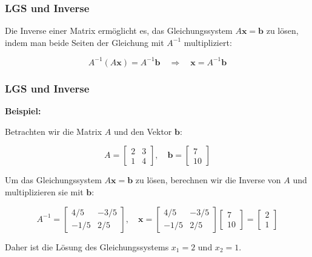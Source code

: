 \documentclass{beamer}
\begin{document}
\begin{frame}
  \frametitle{LGS und Inverse}
  Die Inverse einer Matrix ermöglicht es, das Gleichungssystem $A \mathbf{x} = \mathbf{b}$ zu lösen, indem man beide Seiten der Gleichung mit $A^{-1}$ multipliziert:
  
  \[
  A^{-1} (A \mathbf{x}) = A^{-1} \mathbf{b} \quad \Rightarrow \quad \mathbf{x} = A^{-1} \mathbf{b}
  \]
\end{frame}

\begin{frame}
  \frametitle{LGS und Inverse}
  \textbf{Beispiel:}
  
  Betrachten wir die Matrix $A$ und den Vektor $\mathbf{b}$:
  
  \[
  A = \begin{bmatrix} 2 & 3 \\ 1 & 4 \end{bmatrix}, \quad \mathbf{b} = \begin{bmatrix} 7 \\ 10 \end{bmatrix}
  \]
  
  Um das Gleichungssystem $A \mathbf{x} = \mathbf{b}$ zu lösen, berechnen wir die Inverse von $A$ und multiplizieren sie mit $\mathbf{b}$:
  
  \[
  A^{-1} = \begin{bmatrix} 4/5 & -3/5 \\ -1/5 & 2/5 \end{bmatrix}, \quad \mathbf{x} = \begin{bmatrix} 4/5 & -3/5 \\ -1/5 & 2/5 \end{bmatrix} \begin{bmatrix} 7 \\ 10 \end{bmatrix} = \begin{bmatrix} 2 \\ 1 \end{bmatrix}
  \]
  
  Daher ist die Lösung des Gleichungssystems $x_1 = 2$ und $x_2 = 1$. 
\end{frame}
\end{document}
